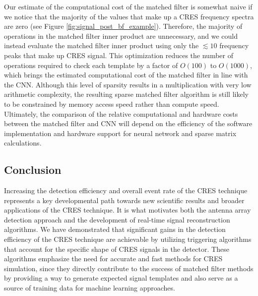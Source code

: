 Our estimate of the computational cost of the matched filter is somewhat naive if we notice that the majority of the values that make up a CRES frequency spectra are zero (see Figure \ref{fig:signal_post_bf_example}). Therefore, the majority of operations in the matched filter inner product are unnecessary, and we could instead evaluate the matched filter inner product using only the $\lesssim10$ frequency peaks that make up CRES signal. This optimization reduces the number of operations required to check each template by a factor of $O(100)$ to $O(1000)$, which brings the estimated computational cost of the matched filter in line with the CNN. Although this level of sparsity results in a multiplication with very low arithmetic complexity, the resulting sparse matched filter algorithm is still likely to be constrained by memory access speed rather than compute speed. Ultimately, the comparison of the relative computational and hardware costs between the matched filter and CNN will depend on the efficiency of the software implementation and hardware support for neural network and sparse matrix calculations.


\subsection{Conclusion}
\label{sec:conclusion}

Increasing the detection efficiency and overall event rate of the CRES technique represents a key developmental path towards new scientific results and broader applications of the CRES technique. It is what motivates both the antenna array detection approach and the development of real-time signal reconstruction algorithms. We have demonstrated that significant gains in the detection efficiency of the CRES technique are achievable by utilizing triggering algorithms that account for the specific shape of CRES signals in the detector. These algorithms emphasize the need for accurate and fast methods for CRES simulation, since they directly contribute to the success of matched filter methods by providing a way to generate expected signal templates and also serve as a source of training data for machine learning approaches. %


